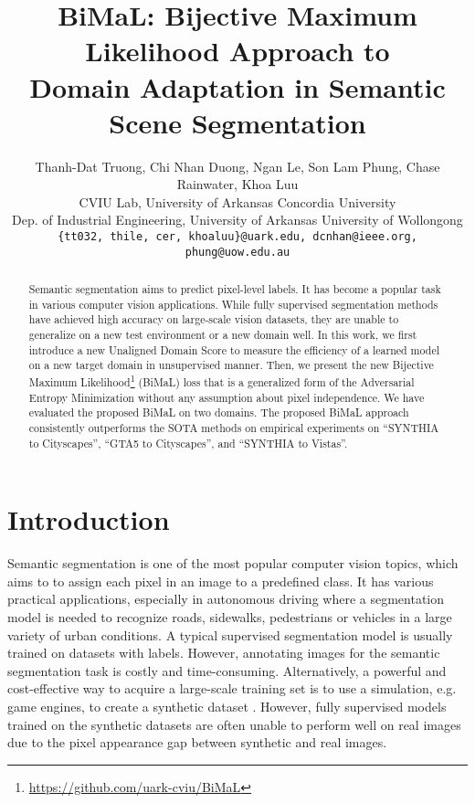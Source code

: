 \documentclass[10pt,twocolumn,letterpaper]{article}
\begin{document}
\title{BiMaL: Bijective Maximum Likelihood Approach to \\Domain Adaptation in Semantic Scene Segmentation}

\author{Thanh-Dat Truong, Chi Nhan Duong, Ngan Le, Son Lam Phung, Chase Rainwater, Khoa Luu\\
CVIU Lab, University of Arkansas \quad 
Concordia University \\
Dep. of Industrial Engineering, University of Arkansas \quad
University of Wollongong\\
{\tt\small \{tt032, thile, cer, khoaluu\}@uark.edu, dcnhan@ieee.org, phung@uow.edu.au}
}

\maketitle
\ificcvfinal\thispagestyle{empty}\fi

\begin{abstract}
Semantic segmentation aims to predict pixel-level labels. It has become a popular task in various computer vision applications. While fully supervised segmentation methods have achieved high accuracy on large-scale vision datasets, they are unable to generalize on a new test environment or a new domain well. In this work, we first introduce a new Unaligned Domain Score to measure the efficiency of a learned model on a new target domain in unsupervised manner. Then, we present the new Bijective Maximum Likelihood\footnote{\url{https://github.com/uark-cviu/BiMaL}} (BiMaL) loss that is a generalized form of the Adversarial Entropy Minimization without any assumption about pixel independence. We have evaluated the proposed BiMaL on two domains. The proposed BiMaL approach consistently outperforms the SOTA methods on empirical experiments on ``SYNTHIA to Cityscapes'', ``GTA5 to Cityscapes'', and ``SYNTHIA to Vistas''.

\end{abstract}

\section{Introduction}

Semantic segmentation is one of the most popular  computer vision topics, which aims to to assign each pixel in an image to a 
predefined class.
It has various practical applications, especially in autonomous driving where a segmentation model is needed to recognize roads, sidewalks, pedestrians or vehicles in a large variety of urban conditions. A typical supervised segmentation model is usually trained on datasets with labels. However, annotating images for the semantic segmentation task is costly and time-consuming. 
Alternatively, a powerful and cost-effective way to acquire a large-scale training set is to use a simulation, e.g. game engines, to create a synthetic dataset \cite{Richter_2016_ECCV, Ros_2016_CVPR}. However, fully supervised models \cite{chen2018deeplab, le2018segmentation} trained on the synthetic datasets are often unable to perform well on real images due to the pixel appearance gap between synthetic and real images.
\end{document}
